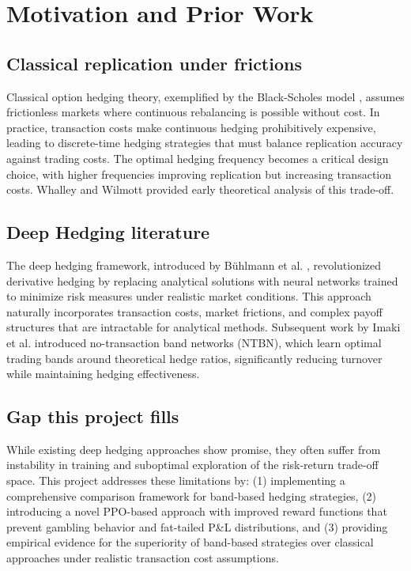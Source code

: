 \documentclass[11pt,letterpaper]{article}
\begin{document}
\section{Motivation and Prior Work}
\subsection{Classical replication under frictions}
Classical option hedging theory, exemplified by the Black-Scholes model \cite{black1973pricing}, assumes frictionless markets where continuous rebalancing is possible without cost. In practice, transaction costs make continuous hedging prohibitively expensive, leading to discrete-time hedging strategies that must balance replication accuracy against trading costs. The optimal hedging frequency becomes a critical design choice, with higher frequencies improving replication but increasing transaction costs. Whalley and Wilmott \cite{whalley1997optimal} provided early theoretical analysis of this trade-off.

\subsection{Deep Hedging literature}
The deep hedging framework, introduced by Bühlmann et al. \cite{buehler2019deep}, revolutionized derivative hedging by replacing analytical solutions with neural networks trained to minimize risk measures under realistic market conditions. This approach naturally incorporates transaction costs, market frictions, and complex payoff structures that are intractable for analytical methods. Subsequent work by Imaki et al. \cite{imaki2021no} introduced no-transaction band networks (NTBN), which learn optimal trading bands around theoretical hedge ratios, significantly reducing turnover while maintaining hedging effectiveness.

\subsection{Gap this project fills}
While existing deep hedging approaches show promise, they often suffer from instability in training and suboptimal exploration of the risk-return trade-off space. This project addresses these limitations by: (1) implementing a comprehensive comparison framework for band-based hedging strategies, (2) introducing a novel PPO-based approach \cite{schulman2017proximal} with improved reward functions that prevent gambling behavior and fat-tailed P\&L distributions, and (3) providing empirical evidence for the superiority of band-based strategies over classical approaches under realistic transaction cost assumptions.
\end{document}
